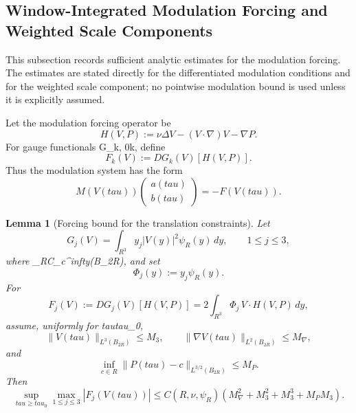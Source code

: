 \documentclass[11pt]{amsart}
\def\({}%
\def\){}%
\def\mathbb#1{#1}%
\def\tau{tau}%
\def\infty{infty}%
\theoremstyle{plain}
\newtheorem{lemma}[lemma]{Lemma}
\theoremstyle{definition}
\theoremstyle{remark}
\begin{document}
\subsection{Window-Integrated Modulation Forcing and Weighted Scale Components}

This subsection records sufficient analytic estimates for the modulation
forcing.  The estimates are stated directly for the differentiated modulation
conditions and for the weighted scale component; no pointwise modulation bound
is used unless it is explicitly assumed.

Let the modulation forcing operator be
\[
  H(V,P):=\nu\Delta V-(V\cdot\nabla)V-\nabla P.
\]
For gauge functionals \(G_k\), \(0\le k\), define
\[
  F_k(V):=DG_k(V)[H(V,P)].
\]
Thus the modulation system has the form
\[
  M(V(\tau))
  \begin{pmatrix}
  a(\tau)\\ b(\tau)
  \end{pmatrix}
  =
  -F(V(\tau)).
\]

\begin{lemma}[Forcing bound for the translation constraints]
\label{paper7:lem:translation-constraint-forcing}
Let
\[
  G_j(V)=\int_{\mathbb R^3}y_j|V(y)|^2\psi_R(y)\,dy,
  \qquad 1\le j\le3,
\]
where \(\psi_R\in C_c^\infty(B_{2R})\), and set
\[
  \Phi_j(y):=y_j\psi_R(y).
\]
For
\[
  F_j(V):=DG_j(V)[H(V,P)]
  =
  2\int_{\mathbb R^3}\Phi_j\,V\cdot H(V,P)\,dy,
\]
assume, uniformly for \(\tau\ge\tau_0\),
\[
  \|V(\tau)\|_{L^3(B_{2R})}\le M_3,\qquad
  \|\nabla V(\tau)\|_{L^2(B_{2R})}\le M_\nabla,
\]
and
\[
  \inf_{c\in\mathbb R}
  \|P(\tau)-c\|_{L^{3/2}(B_{2R})}\le M_P.
\]
Then
\[
  \sup_{\tau\ge\tau_0}\max_{1\le j\le3}|F_j(V(\tau))|
  \le
  C(R,\nu,\psi_R)
  \left(M_\nabla^2+M_3^2+M_3^3+M_PM_3\right).
\]
\end{lemma}
\end{document}
